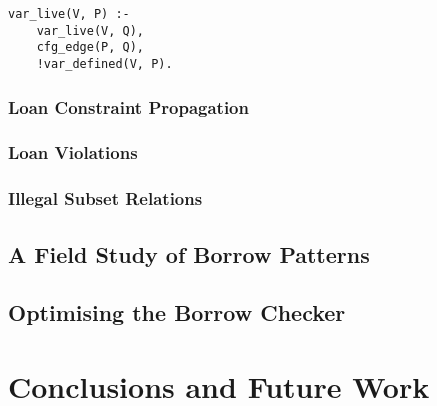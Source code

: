 \documentclass{UUThesisTemplate}
\newcommand{\fixme}[1] {{\color{red}#1}}
\begin{document}
\begin{verbatim}
var_live(V, P) :-
    var_live(V, Q),
    cfg_edge(P, Q),
    !var_defined(V, P).
\end{verbatim}


\subsection{Loan Constraint Propagation}

\subsection{Loan Violations}

\subsection{Illegal Subset Relations}

\section{A Field Study of Borrow Patterns}

\section{Optimising the Borrow Checker}


\chapter{Conclusions and Future Work}


\printbibliography[heading=bibintoc]
\end{document}
